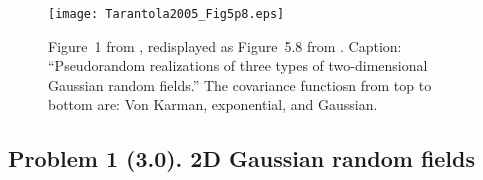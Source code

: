 \documentclass[11pt,titlepage,fleqn]{article}
\begin{document}
\clearpage\pagebreak

\begin{figure}
\centering
\texttt{[image: Tarantola2005\_Fig5p8.eps]}
%
\caption[]
{{
Figure~1 from \citet{FrankelClayton1986}, redisplayed as Figure~5.8 from \citet{Tarantola2005}. Caption: ``Pseudorandom realizations of three types of two-dimensional Gaussian random fields.'' The covariance functiosn from top to bottom are: Von Karman, exponential, and Gaussian.
\label{fig:frankel}
}}
\end{figure}


\clearpage\pagebreak
\subsection*{Problem 1 (3.0). 2D Gaussian random fields}
\end{document}
